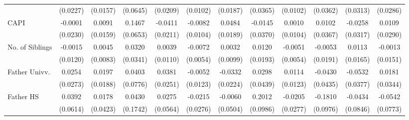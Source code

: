 \begin{table}[htbp]
\begin{tabular}{l*{11}{c}}
            &    (0.0227)         &    (0.0157)         &    (0.0645)         &    (0.0209)         &    (0.0102)         &    (0.0187)         &    (0.0365)         &    (0.0102)         &    (0.0362)         &    (0.0313)         &    (0.0286)         \\
\addlinespace
CAPI        &     -0.0001         &      0.0091         &      0.1467\sym{*}  &     -0.0411         &     -0.0082         &      0.0484\sym{*}  &     -0.0145         &      0.0010         &      0.0102         &     -0.0258         &      0.0109         \\
            &    (0.0230)         &    (0.0159)         &    (0.0653)         &    (0.0211)         &    (0.0104)         &    (0.0189)         &    (0.0370)         &    (0.0104)         &    (0.0367)         &    (0.0317)         &    (0.0290)         \\
\addlinespace
No. of Siblings&     -0.0015         &      0.0045         &      0.0320         &      0.0039         &     -0.0072         &      0.0032         &      0.0120         &     -0.0051         &     -0.0053         &      0.0113         &     -0.0013         \\
            &    (0.0120)         &    (0.0083)         &    (0.0341)         &    (0.0110)         &    (0.0054)         &    (0.0099)         &    (0.0193)         &    (0.0054)         &    (0.0191)         &    (0.0165)         &    (0.0151)         \\
\addlinespace
Father Univv.&      0.0254         &      0.0197         &      0.0403         &      0.0381         &     -0.0052         &     -0.0332         &      0.0298         &      0.0114         &     -0.0430         &     -0.0532         &      0.0181         \\
            &    (0.0273)         &    (0.0188)         &    (0.0776)         &    (0.0251)         &    (0.0123)         &    (0.0224)         &    (0.0439)         &    (0.0123)         &    (0.0435)         &    (0.0377)         &    (0.0344)         \\
\addlinespace
Father HS   &      0.0392         &      0.0178         &      0.0430         &      0.0275         &     -0.0215         &     -0.0060         &      0.2012\sym{*}  &     -0.0205         &     -0.1810         &     -0.0434         &     -0.0542         \\
            &    (0.0614)         &    (0.0423)         &    (0.1742)         &    (0.0564)         &    (0.0276)         &    (0.0504)         &    (0.0986)         &    (0.0277)         &    (0.0976)         &    (0.0846)         &    (0.0773)         \\

\end{tabular}
\end{table}
